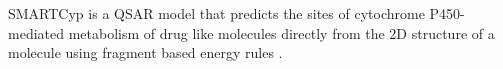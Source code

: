 SMARTCyp is a QSAR model that predicts the sites of cytochrome P450-mediated metabolism of drug like molecules directly from the 2D structure of a molecule using fragment based energy rules \cite{Rydberg_2010}.